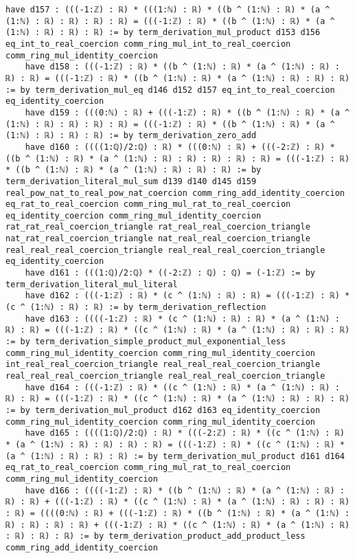 \documentclass{article}
\begin{document}
\begin{tcolorbox}[colback=white!10, width=\linewidth]
\begin{lstlisting}[language=Lean4]
    have d157 : (((-1:ℤ) : ℝ) * (((1:ℕ) : ℝ) * ((b ^ (1:ℕ) : ℝ) * (a ^ (1:ℕ) : ℝ) : ℝ) : ℝ) : ℝ) = (((-1:ℤ) : ℝ) * ((b ^ (1:ℕ) : ℝ) * (a ^ (1:ℕ) : ℝ) : ℝ) : ℝ) := by term_derivation_mul_product d153 d156 eq_int_to_real_coercion comm_ring_mul_int_to_real_coercion comm_ring_mul_identity_coercion
    have d158 : (((-1:ℤ) : ℝ) * ((b ^ (1:ℕ) : ℝ) * (a ^ (1:ℕ) : ℝ) : ℝ) : ℝ) = (((-1:ℤ) : ℝ) * ((b ^ (1:ℕ) : ℝ) * (a ^ (1:ℕ) : ℝ) : ℝ) : ℝ) := by term_derivation_mul_eq d146 d152 d157 eq_int_to_real_coercion eq_identity_coercion
    have d159 : (((0:ℕ) : ℝ) + (((-1:ℤ) : ℝ) * ((b ^ (1:ℕ) : ℝ) * (a ^ (1:ℕ) : ℝ) : ℝ) : ℝ) : ℝ) = (((-1:ℤ) : ℝ) * ((b ^ (1:ℕ) : ℝ) * (a ^ (1:ℕ) : ℝ) : ℝ) : ℝ) := by term_derivation_zero_add
    have d160 : ((((1:ℚ)/2:ℚ) : ℝ) * (((0:ℕ) : ℝ) + (((-2:ℤ) : ℝ) * ((b ^ (1:ℕ) : ℝ) * (a ^ (1:ℕ) : ℝ) : ℝ) : ℝ) : ℝ) : ℝ) = (((-1:ℤ) : ℝ) * ((b ^ (1:ℕ) : ℝ) * (a ^ (1:ℕ) : ℝ) : ℝ) : ℝ) := by term_derivation_literal_mul_sum d139 d140 d145 d159 real_pow_nat_to_real_pow_nat_coercion comm_ring_add_identity_coercion eq_rat_to_real_coercion comm_ring_mul_rat_to_real_coercion eq_identity_coercion comm_ring_mul_identity_coercion rat_rat_real_coercion_triangle rat_real_real_coercion_triangle nat_rat_real_coercion_triangle nat_real_real_coercion_triangle real_real_real_coercion_triangle real_real_real_coercion_triangle eq_identity_coercion
    have d161 : (((1:ℚ)/2:ℚ) * ((-2:ℤ) : ℚ) : ℚ) = (-1:ℤ) := by term_derivation_literal_mul_literal
    have d162 : (((-1:ℤ) : ℝ) * (c ^ (1:ℕ) : ℝ) : ℝ) = (((-1:ℤ) : ℝ) * (c ^ (1:ℕ) : ℝ) : ℝ) := by term_derivation_reflection
    have d163 : ((((-1:ℤ) : ℝ) * (c ^ (1:ℕ) : ℝ) : ℝ) * (a ^ (1:ℕ) : ℝ) : ℝ) = (((-1:ℤ) : ℝ) * ((c ^ (1:ℕ) : ℝ) * (a ^ (1:ℕ) : ℝ) : ℝ) : ℝ) := by term_derivation_simple_product_mul_exponential_less comm_ring_mul_identity_coercion comm_ring_mul_identity_coercion int_real_real_coercion_triangle real_real_real_coercion_triangle real_real_real_coercion_triangle real_real_real_coercion_triangle
    have d164 : (((-1:ℤ) : ℝ) * ((c ^ (1:ℕ) : ℝ) * (a ^ (1:ℕ) : ℝ) : ℝ) : ℝ) = (((-1:ℤ) : ℝ) * ((c ^ (1:ℕ) : ℝ) * (a ^ (1:ℕ) : ℝ) : ℝ) : ℝ) := by term_derivation_mul_product d162 d163 eq_identity_coercion comm_ring_mul_identity_coercion comm_ring_mul_identity_coercion
    have d165 : ((((1:ℚ)/2:ℚ) : ℝ) * (((-2:ℤ) : ℝ) * ((c ^ (1:ℕ) : ℝ) * (a ^ (1:ℕ) : ℝ) : ℝ) : ℝ) : ℝ) = (((-1:ℤ) : ℝ) * ((c ^ (1:ℕ) : ℝ) * (a ^ (1:ℕ) : ℝ) : ℝ) : ℝ) := by term_derivation_mul_product d161 d164 eq_rat_to_real_coercion comm_ring_mul_rat_to_real_coercion comm_ring_mul_identity_coercion
    have d166 : ((((-1:ℤ) : ℝ) * ((b ^ (1:ℕ) : ℝ) * (a ^ (1:ℕ) : ℝ) : ℝ) : ℝ) + (((-1:ℤ) : ℝ) * ((c ^ (1:ℕ) : ℝ) * (a ^ (1:ℕ) : ℝ) : ℝ) : ℝ) : ℝ) = ((((0:ℕ) : ℝ) + (((-1:ℤ) : ℝ) * ((b ^ (1:ℕ) : ℝ) * (a ^ (1:ℕ) : ℝ) : ℝ) : ℝ) : ℝ) + (((-1:ℤ) : ℝ) * ((c ^ (1:ℕ) : ℝ) * (a ^ (1:ℕ) : ℝ) : ℝ) : ℝ) : ℝ) := by term_derivation_product_add_product_less comm_ring_add_identity_coercion

\end{lstlisting}
\end{tcolorbox}
\end{document}
